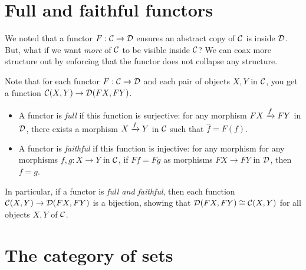 \section{Full and faithful functors}
We noted that a functor $F : \mathcal C \to \mathcal D$ ensures an abstract copy of 
$\mathcal C$ is inside $\mathcal D$. But, what if we want \emph{more} of $\mathcal C$ 
to be visible inside $\mathcal C$? We can coax more structure out by 
enforcing that the functor does not collapse any structure.

Note that for each functor \(F : \mathcal C \to \mathcal D\) and each pair of objects \(X,Y\) in \(\mathcal C\),
you get a function \(\mathcal C(X,Y) \to \mathcal D(FX,FY)\).
\begin{itemize}
\item A functor is \emph{full} if this function is surjective: for any morphism \(FX \xrightarrow{\hat f} FY\) in \(\mathcal D\),
  there exists a morphism \(X \xrightarrow{f} Y\) in \(\mathcal C\) such that \(\hat f = F(f)\).
\item A functor is \emph{faithful} if this function is injective: for any morphism for any morphisms \(f,g : X \to Y\) in \(\mathcal C\),
  if \(Ff = Fg\) as morphisms \(FX\to FY\) in \(\mathcal D\), then \(f = g\).
\end{itemize}
In particular, if a functor is \emph{full and faithful}, then each function \(\mathcal C(X,Y) \to \mathcal D(FX,FY)\) is a bijection,
showing that \(\mathcal D(FX,FY) \cong \mathcal C(X,Y)\) for all objects \(X,Y\) of \(\mathcal C\).



\section{The category of sets}

